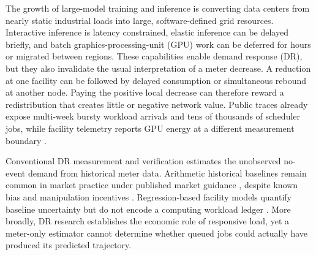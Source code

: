 \documentclass[10pt,journal]{IEEEtran}
\begin{document}
The growth of large-model training and inference is converting data centers
from nearly static industrial loads into large, software-defined grid
resources. Interactive inference is latency constrained, elastic inference can
be delayed briefly, and batch graphics-processing-unit (GPU) work can be deferred for hours or migrated
between regions. These capabilities enable demand response (DR), but they also
invalidate the usual interpretation of a meter decrease. A reduction at one
facility can be followed by delayed consumption or simultaneous rebound at
another node. Paying the positive local decrease can therefore reward a
redistribution that creates little or negative network value.
Public traces already expose multi-week bursty workload arrivals and tens of
thousands of scheduler jobs, while facility telemetry reports GPU energy at a
different measurement boundary \cite{wang2024burstgpt,samsi2021supercloud}.

Conventional DR measurement and verification estimates the unobserved
no-event demand from historical meter data. Arithmetic historical baselines
remain common in market practice under published market guidance
\cite{caiso2017baseline}, despite known bias and manipulation incentives
\cite{wang2022baseline}. Regression-based facility models quantify
baseline uncertainty but do not encode a computing workload ledger
\cite{wang2022baseline}. More broadly, DR
research establishes the economic role of responsive load, yet a meter-only
estimator cannot determine whether queued jobs could actually have produced
its predicted trajectory.
\end{document}

